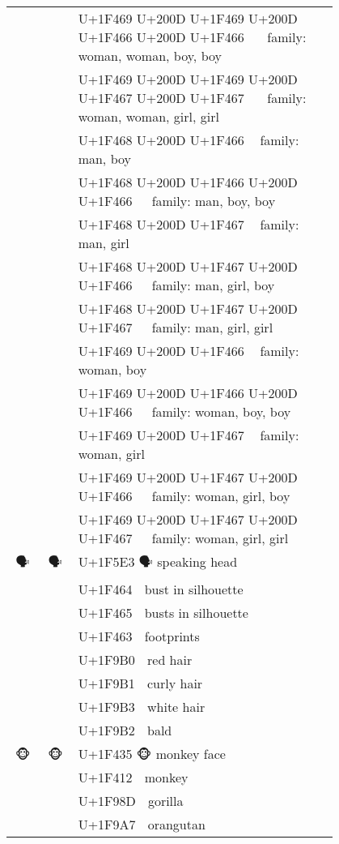 \documentclass[a4paper,12pt]{article}
\newcommand{\fontA}[1]{{\fontspec[RawFeature={mode=harf,+dist,+ccmp}]{Segoe UI Emoji} #1}}
\newcommand{\fontB}[1]{{\fontspec[RawFeature={mode=harf,+dist,+ccmp}]{Noto Color Emoji} #1}}
\begin{document}
\begin{longtable}[c]{ccp{0.8\linewidth}}
\fontA{👩‍👩‍👦‍👦}&\fontB{👩‍👩‍👦‍👦}&U+1F469 U+200D U+1F469 U+200D U+1F466 U+200D U+1F466 👩‍👩‍👦‍👦 family: woman, woman, boy, boy\\
\fontA{👩‍👩‍👧‍👧}&\fontB{👩‍👩‍👧‍👧}&U+1F469 U+200D U+1F469 U+200D U+1F467 U+200D U+1F467 👩‍👩‍👧‍👧 family: woman, woman, girl, girl\\
\fontA{👨‍👦}&\fontB{👨‍👦}&U+1F468 U+200D U+1F466 👨‍👦 family: man, boy\\
\fontA{👨‍👦‍👦}&\fontB{👨‍👦‍👦}&U+1F468 U+200D U+1F466 U+200D U+1F466 👨‍👦‍👦 family: man, boy, boy\\
\fontA{👨‍👧}&\fontB{👨‍👧}&U+1F468 U+200D U+1F467 👨‍👧 family: man, girl\\
\fontA{👨‍👧‍👦}&\fontB{👨‍👧‍👦}&U+1F468 U+200D U+1F467 U+200D U+1F466 👨‍👧‍👦 family: man, girl, boy\\
\fontA{👨‍👧‍👧}&\fontB{👨‍👧‍👧}&U+1F468 U+200D U+1F467 U+200D U+1F467 👨‍👧‍👧 family: man, girl, girl\\
\fontA{👩‍👦}&\fontB{👩‍👦}&U+1F469 U+200D U+1F466 👩‍👦 family: woman, boy\\
\fontA{👩‍👦‍👦}&\fontB{👩‍👦‍👦}&U+1F469 U+200D U+1F466 U+200D U+1F466 👩‍👦‍👦 family: woman, boy, boy\\
\fontA{👩‍👧}&\fontB{👩‍👧}&U+1F469 U+200D U+1F467 👩‍👧 family: woman, girl\\
\fontA{👩‍👧‍👦}&\fontB{👩‍👧‍👦}&U+1F469 U+200D U+1F467 U+200D U+1F466 👩‍👧‍👦 family: woman, girl, boy\\
\fontA{👩‍👧‍👧}&\fontB{👩‍👧‍👧}&U+1F469 U+200D U+1F467 U+200D U+1F467 👩‍👧‍👧 family: woman, girl, girl\\
\fontA{🗣}&\fontB{🗣}&U+1F5E3 🗣 speaking head\\
\fontA{👤}&\fontB{👤}&U+1F464 👤 bust in silhouette\\
\fontA{👥}&\fontB{👥}&U+1F465 👥 busts in silhouette\\
\fontA{👣}&\fontB{👣}&U+1F463 👣 footprints\\
\fontA{🦰}&\fontB{🦰}&U+1F9B0 🦰 red hair\\
\fontA{🦱}&\fontB{🦱}&U+1F9B1 🦱 curly hair\\
\fontA{🦳}&\fontB{🦳}&U+1F9B3 🦳 white hair\\
\fontA{🦲}&\fontB{🦲}&U+1F9B2 🦲 bald\\
\fontA{🐵}&\fontB{🐵}&U+1F435 🐵 monkey face\\
\fontA{🐒}&\fontB{🐒}&U+1F412 🐒 monkey\\
\fontA{🦍}&\fontB{🦍}&U+1F98D 🦍 gorilla\\
\fontA{🦧}&\fontB{🦧}&U+1F9A7 🦧 orangutan\\

\end{longtable}
\end{document}

